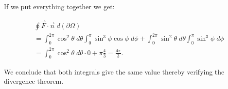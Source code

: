 \documentclass[11pt]{article}
\begin{document}
If we put everything together we get:

\begin{align*}
        &
        \oint \vec{F}\cdot \vec{n} \;d(\partial \Omega)
        \\&
        =
        \int_{0}^{2\pi}\cos^2\theta\;d\theta\int_0^{\pi}\sin^3\phi\cos\phi\;d\phi + \int_{0}^{2\pi}\sin^2\theta\;d\theta\int_0^{\pi}\sin^3\phi\;d\phi 
        \\&
        =\int_{0}^{2\pi}\cos^2\theta\;d\theta \cdot 0+ \pi\frac{4}{3} = \frac{4\pi}{3}
        .
    \end{align*}

We conclude that both integrals give the same value thereby verifying the divergence theorem.
\end{document}
